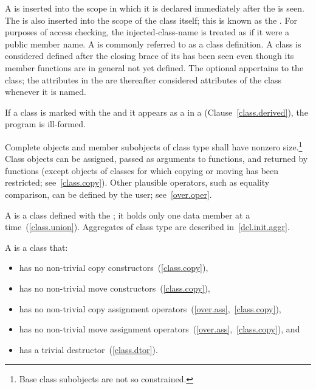 \pnum
A  is inserted into the scope in which it is
declared immediately after the  is seen. The
 is also inserted into the scope of the class
itself; this is known as the .
%
For purposes of access checking, the injected-class-name is treated as
if it were a public member name.
%
A  is commonly referred to as a class
definition.
%
A class is considered defined after the closing brace of its
 has been seen even though its member
functions are in general not yet defined.
The optional  appertains to the class; the attributes in
the  are thereafter considered attributes of the class
whenever it is named.

\pnum
If a class is marked with the   and it appears
as a  in a 
(Clause~\ref{class.derived}), the program is ill-formed.

\pnum
{}%
Complete objects and member subobjects of class type shall have nonzero
size.\footnote{Base class subobjects are not so constrained.}
%
\enternote
Class objects can be assigned, passed as arguments to functions, and
returned by functions (except objects of classes for which copying or moving has
been restricted; see~\ref{class.copy}). Other plausible operators, such
as equality comparison, can be defined by the user; see~\ref{over.oper}.
\exitnote

\pnum
{}%
%
%
A  is a class defined with the 
;
%
it holds only one data member at a time~(\ref{class.union}).
\enternote
Aggregates of class type are described in~\ref{dcl.init.aggr}.
\exitnote

%
%
\pnum
A  is a class that:

\begin{itemize}
\item has no non-trivial copy constructors~(\ref{class.copy}),
\item has no non-trivial move constructors~(\ref{class.copy}),
\item has no non-trivial copy assignment operators~(\ref{over.ass},~\ref{class.copy}),
\item has no non-trivial move assignment operators~(\ref{over.ass},~\ref{class.copy}), and
\item has a trivial destructor~(\ref{class.dtor}).
\end{itemize}

